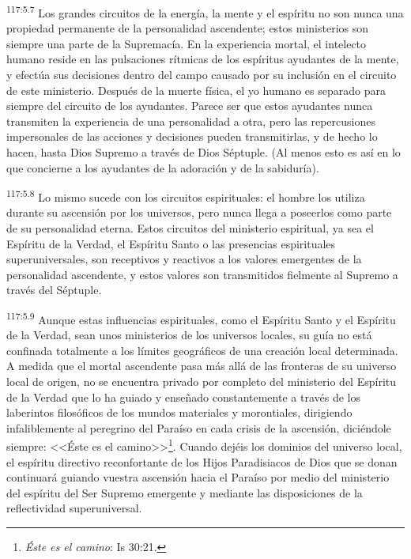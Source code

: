 \documentclass[twoside, 11pt]{book}
\begin{document}
\par
\textsuperscript{117:5.7} Los grandes circuitos de la energía, la mente y el espíritu no son nunca una propiedad permanente de la personalidad ascendente; estos ministerios son siempre una parte de la Supremacía. En la experiencia mortal, el intelecto humano reside en las pulsaciones rítmicas de los espíritus ayudantes de la mente, y efectúa sus decisiones dentro del campo causado por su inclusión en el circuito de este ministerio. Después de la muerte física, el yo humano es separado para siempre del circuito de los ayudantes. Parece ser que estos ayudantes nunca transmiten la experiencia de una personalidad a otra, pero las repercusiones impersonales de las acciones y decisiones pueden transmitirlas, y de hecho lo hacen, hasta Dios Supremo a través de Dios Séptuple. (Al menos esto es así en lo que concierne a los ayudantes de la adoración y de la sabiduría).

\par
\textsuperscript{117:5.8} Lo mismo sucede con los circuitos espirituales: el hombre los utiliza durante su ascensión por los universos, pero nunca llega a poseerlos como parte de su personalidad eterna. Estos circuitos del ministerio espiritual, ya sea el Espíritu de la Verdad, el Espíritu Santo o las presencias espirituales superuniversales, son receptivos y reactivos a los valores emergentes de la personalidad ascendente, y estos valores son transmitidos fielmente al Supremo a través del Séptuple.

\par
\textsuperscript{117:5.9} Aunque estas influencias espirituales, como el Espíritu Santo y el Espíritu de la Verdad, sean unos ministerios de los universos locales, su guía no está confinada totalmente a los límites geográficos de una creación local determinada. A medida que el mortal ascendente pasa más allá de las fronteras de su universo local de origen, no se encuentra privado por completo del ministerio del Espíritu de la Verdad que lo ha guiado y enseñado constantemente a través de los laberintos filosóficos de los mundos materiales y morontiales, dirigiendo infaliblemente al peregrino del Paraíso en cada crisis de la ascensión, diciéndole siempre: <<Éste es el camino>>\footnote{\textit{Éste es el camino}: Is 30:21.}. Cuando dejéis los dominios del universo local, el espíritu directivo reconfortante de los Hijos Paradisiacos de Dios que se donan continuará guiando vuestra ascensión hacia el Paraíso por medio del ministerio del espíritu del Ser Supremo emergente y mediante las disposiciones de la reflectividad superuniversal.
\end{document}
